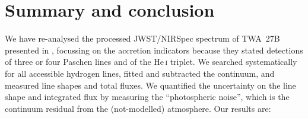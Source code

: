 \documentclass[twocolumn,twocolumnappendix]{aastex631}
\def\HeI{\ensuremath{\mathrm{He}}\,\textsc{i}\xspace}       %
\def\HeIt{\HeI}                     %
\def\twb{TWA~27B\xspace}
\begin{document}
%
%
%
%
%
%
%
%
%
%









%

\section{Summary and conclusion}
 \label{sec:summconc}

We have re-analysed the processed JWST/NIRSpec spectrum of \twb presented in \citet{luhman23c}, focussing on the accretion indicators because they stated detections of three or four Paschen lines and of the \HeIt triplet. We searched systematically for all accessible hydrogen lines, fitted and subtracted the continuum, and measured line shapes and total fluxes.
%
We quantified the uncertainty on the line shape and integrated flux by measuring the ``photospheric noise'', which is the continuum residual from the (not-modelled) atmosphere.
Our results are:
\end{document}
